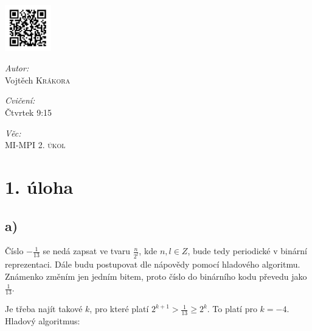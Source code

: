\documentclass[a4paper, 11pt]{article}
\begin{document}
\includegraphics[width=0.15\textwidth]{./img/qr_usarmap_krakovoj.png}~\\[1cm]
\begin{minipage}{0.4\textwidth}
\begin{flushleft} \large
\emph{Autor:}\\
Vojtěch \textsc{Krákora}
\end{flushleft}
\end{minipage}%
\begin{minipage}{0.4\textwidth}
\begin{flushleft} \large
\emph{Cvičení:}\\
Čtvrtek 9:15
\end{flushleft}
\end{minipage}%
\begin{minipage}{0.4\textwidth}
\begin{flushleft} \large
\emph{Věc:} \\
MI-MPI \textsc{2. úkol}
\end{flushleft}
\end{minipage}
\section*{1. úloha}
 \subsection*{a)}
  Číslo $-\frac{1}{13}$ se nedá zapsat ve tvaru $\frac{n}{2^l}$, kde $n,l \in Z$, bude tedy periodické v binární reprezentaci.
  Dále budu postupovat dle nápovědy pomocí hladového algoritmu.
  Známenko změním jen jedním bitem, proto číslo do binárního kodu převedu jako  $\frac{1}{13}$.
  
  Je třeba najít takové $k$, pro které platí $2^{k+1} > \frac{1}{13} \geq 2^k$. To platí pro $k = -4$.
  Hladový algoritmus:
\end{document}
